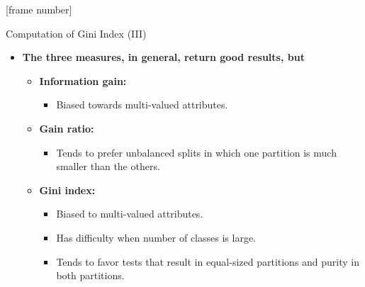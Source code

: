 \documentclass[aspectratio=169,t,table]{beamer}
\begin{document}
  {
    [frame number]
    \begin{frame}{Computation of Gini Index (III)}
      \begin{itemize}
        \item \textbf{The three measures, in general, return good results, but}
        \begin{itemize}
          \item \textbf{\color{airforceblue}Information gain:}
          \begin{itemize}
            \item Biased towards multi-valued attributes.
          \end{itemize}
          \item \textbf{\color{airforceblue}Gain ratio:}
          \begin{itemize}
            \item Tends to prefer unbalanced splits in which one partition is much smaller than the others.
          \end{itemize}
          \item \textbf{\color{airforceblue}Gini index:}
          \begin{itemize}
            \item Biased to multi-valued attributes.
            \item Has difficulty when number of classes is large.
            \item Tends to favor tests that result in equal-sized partitions and purity in both partitions.
          \end{itemize}
        \end{itemize}
      \end{itemize}
    \end{frame}
  }
\end{document}
